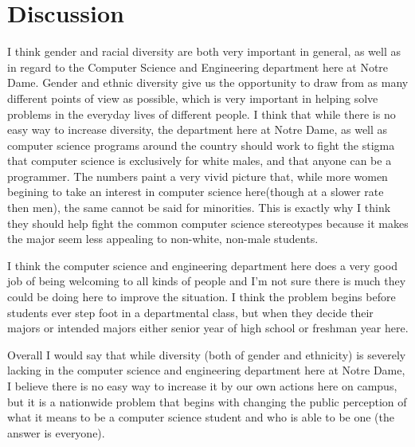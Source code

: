 \documentclass{article}
\begin{document}
\section*{Discussion}

I think gender and racial diversity are both very important in general, as well as in regard to the Computer Science and 
Engineering department here at Notre Dame. Gender and ethnic diversity give us the opportunity to draw from as many 
different points of view as possible, which is very important in helping solve problems in the everyday lives of different 
people. I think that while there is no easy way to increase diversity, the department here at Notre Dame, as well 
as computer science programs around the country should work to fight the stigma that computer science is exclusively 
for white males, and that anyone can be a programmer. The numbers paint a very vivid picture that, while more women 
begining to take an interest in computer science here(though at a slower rate then men), the same cannot be said for minorities. This is exactly why I think 
they should help fight the common computer science stereotypes because it makes the major seem less appealing to 
non-white, non-male students.

I think the computer science and engineering department here does a very good job of being welcoming to all kinds 
of people and I'm not sure there is much they could be doing here to improve the situation. I think the problem begins 
before students ever step foot in a departmental class, but when they decide their majors or intended majors either 
senior year of high school or freshman year here. 

Overall I would say that while diversity (both of gender and ethnicity) is severely lacking in the computer science and 
engineering department here at Notre Dame, I believe there is no easy way to increase it by our own actions here on campus, but it 
is a nationwide problem that begins with changing the public perception of what it means to be a computer science student 
and who is able to be one (the answer is everyone).
\end{document}
